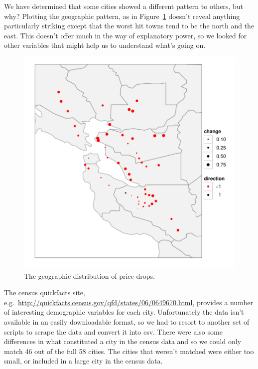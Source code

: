 \documentclass[oneside]{article}
\begin{document}
We have determined that some cities showed a different pattern to others, but why? Plotting the geographic pattern, as in Figure~\ref{fig:geo} doesn't reveal anything particularly striking except that the worst hit towns tend to be the north and the east. This doesn't offer much in the way of explanatory power, so we looked for other variables that might help us to understand what's going on. 

\begin{figure}[htbp]
  \centering
    \includegraphics[width=0.4\linewidth]{cities-geo-changes}
  \caption{The geographic distribution of price drops.}
  \label{fig:geo}
\end{figure}

The census quickfacts site, e.g.\ \url{http://quickfacts.census.gov/qfd/states/06/0649670.html}, provides a number of interesting demographic variables for each city.  Unfortunately the data isn't available in an easily downloadable format, so we had to resort to another set of scripts to scrape the data and convert it into csv.  There were also some differences in what constituted a city in the census data and so we could only match 46 out of the full 58 cities.  The cities that weren't matched were either too small, or included in a large city in the census data.
\end{document}
